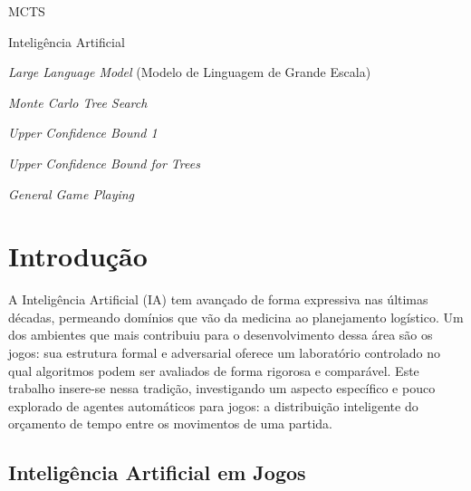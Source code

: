 \documentclass[cic,tc]{iiufrgs}
\begin{document}
\listoftables

\begin{listofabbrv}{MCTS}
    \item[IA]   Inteligência Artificial
    \item[LLM]  \emph{Large Language Model} (Modelo de Linguagem de Grande Escala)
    \item[MCTS] \emph{Monte Carlo Tree Search}
    \item[UCB1] \emph{Upper Confidence Bound 1}
    \item[UCT]  \emph{Upper Confidence Bound for Trees}
    \item[GGP]  \emph{General Game Playing}
\end{listofabbrv}


\tableofcontents

\chapter{Introdução}

A Inteligência Artificial (IA) tem avançado de forma expressiva nas últimas décadas, permeando domínios que vão da medicina ao planejamento logístico. Um dos ambientes que mais contribuiu para o desenvolvimento dessa área são os jogos: sua estrutura formal e adversarial oferece um laboratório controlado no qual algoritmos podem ser avaliados de forma rigorosa e comparável. Este trabalho insere-se nessa tradição, investigando um aspecto específico e pouco explorado de agentes automáticos para jogos: a distribuição inteligente do orçamento de tempo entre os movimentos de uma partida.

\section{Inteligência Artificial em Jogos}
\label{sec:intro_games}
\end{document}
